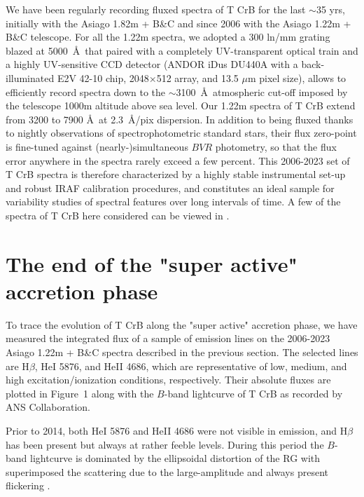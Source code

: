 \documentclass{aastex631}
\begin{document}
We have been regularly recording fluxed spectra of T CrB for the last $\sim$35 yrs,
initially with the Asiago 1.82m + B\&C and since 2006 with the
Asiago 1.22m + B\&C telescope.  For all the 1.22m spectra, we adopted a 300
ln/mm grating blazed at 5000~\AA\ that paired with a completely
UV-transparent optical train and a highly UV-sensitive CCD detector (ANDOR iDus
DU440A with a back-illuminated E2V 42-10 chip, 2048$\times$512 array, and 
13.5 $\mu$m pixel size), allows to efficiently record spectra down to the
$\sim$3100~\AA\ atmospheric cut-off imposed by the telescope 1000m altitude above sea
level.  Our 1.22m spectra of T CrB extend from 3200 to 7900 \AA\ at
2.3~\AA/pix dispersion.  In addition to being fluxed thanks to nightly
observations of spectrophotometric standard stars, their flux zero-point is
fine-tuned against (nearly-)simultaneous $B$$V$$R$ photometry, so that
the flux error anywhere in the spectra rarely exceed a few percent.  This
2006-2023 set of T CrB spectra is therefore characterized by a highly stable
instrumental set-up and robust IRAF calibration procedures, and constitutes an ideal
sample for variability studies of spectral features over long intervals of
time. A few of the spectra of T CrB here considered can be viewed in \citet{2016NewA...47....7M}.

\section{The end of the "super active" accretion phase} \label{sec:results}

To trace the evolution of T CrB along the "super active" accretion phase, we
have measured the integrated flux of a sample of emission lines on the
2006-2023 Asiago 1.22m + B\&C spectra described in the previous section. 
The selected lines are H$\beta$, HeI 5876, and HeII 4686, which are
representative of low, medium, and high excitation/ionization conditions,
respectively.  Their absolute fluxes are plotted in Figure~1 along with the
$B$-band lightcurve of T CrB as recorded by ANS Collaboration.

Prior to 2014, both HeI 5876 and HeII 4686 were not visible in emission, 
and H$\beta$ has been present but always at rather feeble levels.
During this period the $B$-band lightcurve is dominated by the ellipsoidal
distortion of the RG with superimposed the scattering due to the
large-amplitude and always present flickering \citep[eg.][and references
therein]{1998A&A...338..988Z,2010MNRAS.402.2567D}.
\end{document}
